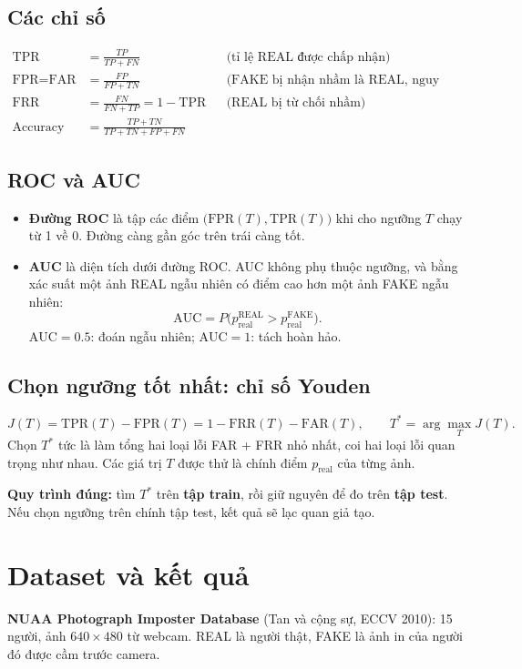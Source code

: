 \documentclass[12pt,a4paper]{article}
\begin{document}
\subsection{Các chỉ số}
\begin{align*}
\text{TPR} &= \frac{TP}{TP+FN} && \text{(tỉ lệ REAL được chấp nhận)}\\
\text{FPR} = \text{FAR} &= \frac{FP}{FP+TN} && \text{(FAKE bị nhận nhầm là REAL, nguy hiểm nhất)}\\
\text{FRR} &= \frac{FN}{FN+TP} = 1-\text{TPR} && \text{(REAL bị từ chối nhầm)}\\
\text{Accuracy} &= \frac{TP+TN}{TP+TN+FP+FN}
\end{align*}

\subsection{ROC và AUC}
\begin{itemize}
  \item \textbf{Đường ROC} là tập các điểm $\big(\text{FPR}(T), \text{TPR}(T)\big)$ khi cho ngưỡng $T$ chạy từ 1 về 0. Đường càng gần góc trên trái càng tốt.
  \item \textbf{AUC} là diện tích dưới đường ROC. AUC không phụ thuộc ngưỡng, và bằng xác suất một ảnh REAL ngẫu nhiên có điểm cao hơn một ảnh FAKE ngẫu nhiên:
  \[
  \text{AUC} = P\big(p_{\text{real}}^{\text{REAL}} > p_{\text{real}}^{\text{FAKE}}\big).
  \]
  $\text{AUC}=0.5$: đoán ngẫu nhiên; $\text{AUC}=1$: tách hoàn hảo.
\end{itemize}

\subsection{Chọn ngưỡng tốt nhất: chỉ số Youden}
\[
J(T) = \text{TPR}(T) - \text{FPR}(T) = 1 - \text{FRR}(T) - \text{FAR}(T),
\qquad
T^{*} = \arg\max_{T} J(T).
\]
Chọn $T^{*}$ tức là làm tổng hai loại lỗi FAR + FRR nhỏ nhất, coi hai loại lỗi quan trọng như nhau. Các giá trị $T$ được thử là chính điểm $p_{\text{real}}$ của từng ảnh.

\textbf{Quy trình đúng:} tìm $T^{*}$ trên \textbf{tập train}, rồi giữ nguyên để đo trên \textbf{tập test}. Nếu chọn ngưỡng trên chính tập test, kết quả sẽ lạc quan giả tạo.

\section{Dataset và kết quả}
\textbf{NUAA Photograph Imposter Database} (Tan và cộng sự, ECCV 2010): 15 người, ảnh $640\times480$ từ webcam. REAL là người thật, FAKE là ảnh in của người đó được cầm trước camera.
\end{document}
